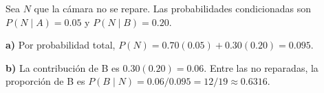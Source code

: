 Sea $N$ que la cámara no se repare. Las probabilidades
condicionadas son $P(N\mid A)=0.05$ y $P(N\mid B)=0.20$.

\textbf{a)} Por probabilidad total,
$P(N)=0.70(0.05)+0.30(0.20)=\boxed{0.095}$.

\textbf{b)} La contribución de B es $0.30(0.20)=0.06$.
Entre las no reparadas, la proporción de B es
$P(B\mid N)=0.06/0.095=\boxed{12/19\approx0.6316}$.
